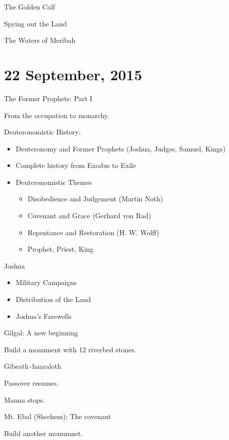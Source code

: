 \documentclass{article}
\begin{document}
    The Golden Calf

    Spying out the Land

    The Waters of Meribah

\section{22 September, 2015}

    \centerline{The Former Prophets: Part I}

    From the occupation to monarchy.

    Deuteronomistic History:

    \begin{itemize}
        \item Deuteronomy and Former Prophets (Joshua, Judges, Samuel, Kings)
        \item Complete history from Exodus to Exile
        \item{Deuteronomistic Themes \\ 
            \begin{itemize}
                \item Disobedience and Judgement (Martin Noth)
                \item Covenant and Grace (Gerhard von Rad)
                \item Repentance and Restoration (H. W. Wolff)
                \item Prophet, Priest, King
            \end{itemize}}
    \end{itemize}

    \centerline{Joshua}

    \begin{itemize}
        \item Military Campaigns
        \item Distribution of the Land
        \item Joshua's Farewells
    \end{itemize}

    Gilgal: A new beginning

    Build a monument with 12 riverbed stones.

    Gibeath\texttt{-}haaraloth

    Passover resumes.

    Manna stops.

    Mt. Ebal (Shechem): The covenant
    
    Build another monumnet.
\end{document}
